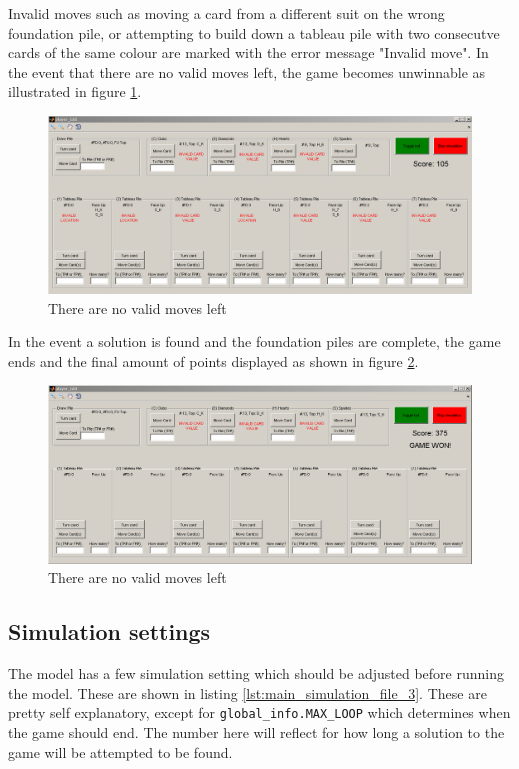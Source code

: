 \documentclass[runningheads,a4paper]{llncs}
\newcommand{\GPenSIM}{../GPenSIM}
\begin{document}
Invalid moves such as moving a card from a different suit on the wrong foundation pile, or attempting to build down a tableau pile with two consecutve cards of the same colour are marked with the error message "Invalid move".
In the event that there are no valid moves left, the game becomes unwinnable as illustrated in figure \ref{fig:nowin}.
\begin{figure}
	\begin{center}
		\includegraphics[width=\textwidth]{images/gameUnwinnable}
		\caption{There are no valid moves left}
		\label{fig:nowin}
	\end{center}
\end{figure}
\newline

In the event a solution is found and the foundation piles are complete, the game ends and the final amount of points displayed as shown in figure \ref{fig:win}.
\begin{figure}
	\begin{center}
		\includegraphics[width=\textwidth]{images/gameWonWScore}
		\caption{There are no valid moves left}
		\label{fig:win}
	\end{center}
\end{figure}

\label{sec:3_gui}
\clearpage
\subsection{Simulation settings}
The model has a few simulation setting which should be adjusted before running the model. These are shown in listing \ref{lst:main_simulation_file_3}. These are pretty self explanatory, except for \verb!global_info.MAX_LOOP! which determines when the game should end. The number here will reflect for how long a solution to the game will be attempted to be found.

\clearpage
\end{document}
